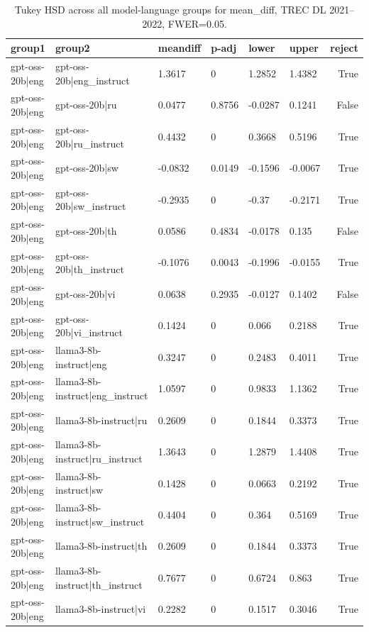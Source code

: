 \begin{table}
\caption{Tukey HSD across all model-language groups for mean_diff, TREC DL 2021--2022, FWER=0.05.}
\label{tab:tukey_all_models_all_langs_2021_2022_mean_diff}
\begin{tabular}{llllllr}
\toprule
group1 & group2 & meandiff & p-adj & lower & upper & reject \\
\midrule
gpt-oss-20b|eng & gpt-oss-20b|eng_instruct & 1.3617 & 0 & 1.2852 & 1.4382 & True \\
gpt-oss-20b|eng & gpt-oss-20b|ru & 0.0477 & 0.8756 & -0.0287 & 0.1241 & False \\
gpt-oss-20b|eng & gpt-oss-20b|ru_instruct & 0.4432 & 0 & 0.3668 & 0.5196 & True \\
gpt-oss-20b|eng & gpt-oss-20b|sw & -0.0832 & 0.0149 & -0.1596 & -0.0067 & True \\
gpt-oss-20b|eng & gpt-oss-20b|sw_instruct & -0.2935 & 0 & -0.37 & -0.2171 & True \\
gpt-oss-20b|eng & gpt-oss-20b|th & 0.0586 & 0.4834 & -0.0178 & 0.135 & False \\
gpt-oss-20b|eng & gpt-oss-20b|th_instruct & -0.1076 & 0.0043 & -0.1996 & -0.0155 & True \\
gpt-oss-20b|eng & gpt-oss-20b|vi & 0.0638 & 0.2935 & -0.0127 & 0.1402 & False \\
gpt-oss-20b|eng & gpt-oss-20b|vi_instruct & 0.1424 & 0 & 0.066 & 0.2188 & True \\
gpt-oss-20b|eng & llama3-8b-instruct|eng & 0.3247 & 0 & 0.2483 & 0.4011 & True \\
gpt-oss-20b|eng & llama3-8b-instruct|eng_instruct & 1.0597 & 0 & 0.9833 & 1.1362 & True \\
gpt-oss-20b|eng & llama3-8b-instruct|ru & 0.2609 & 0 & 0.1844 & 0.3373 & True \\
gpt-oss-20b|eng & llama3-8b-instruct|ru_instruct & 1.3643 & 0 & 1.2879 & 1.4408 & True \\
gpt-oss-20b|eng & llama3-8b-instruct|sw & 0.1428 & 0 & 0.0663 & 0.2192 & True \\
gpt-oss-20b|eng & llama3-8b-instruct|sw_instruct & 0.4404 & 0 & 0.364 & 0.5169 & True \\
gpt-oss-20b|eng & llama3-8b-instruct|th & 0.2609 & 0 & 0.1844 & 0.3373 & True \\
gpt-oss-20b|eng & llama3-8b-instruct|th_instruct & 0.7677 & 0 & 0.6724 & 0.863 & True \\
gpt-oss-20b|eng & llama3-8b-instruct|vi & 0.2282 & 0 & 0.1517 & 0.3046 & True \\

\end{tabular}
\end{table}
